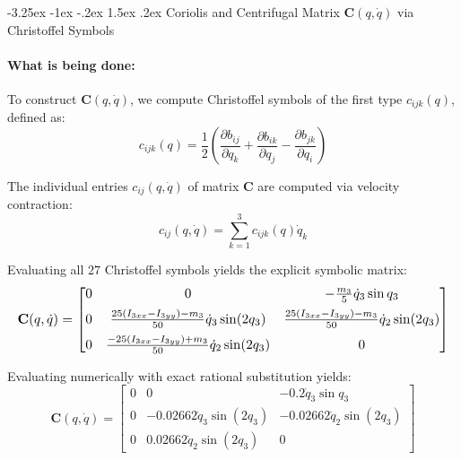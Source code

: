 \documentclass[11pt, a4paper]{article}
\makeatletter
\renewcommand{\subsection}{\@startsection{subsection}{2}{\z@}%
    {-3.25ex \@plus -1ex \@minus -.2ex}%
    {1.5ex \@plus .2ex}%
    {\normalfont\large\bfseries\color{brandaccent}}}
\makeatother
\begin{document}
\subsection{Coriolis and Centrifugal Matrix \texorpdfstring{$\mathbf{C}(q, \dot{q})$}{C(q, dq)} via Christoffel Symbols}
\paragraph{What is being done:}
To construct $\mathbf{C}(q, \dot{q})$, we compute Christoffel symbols of the first type $c_{ijk}(q)$, defined as:
\begin{equation}
    c_{ijk}(q) = \frac{1}{2} \left( \frac{\partial b_{ij}}{\partial q_k} + \frac{\partial b_{ik}}{\partial q_j} - \frac{\partial b_{jk}}{\partial q_i} \right)
\end{equation}

The individual entries $c_{ij}(q, \dot{q})$ of matrix $\mathbf{C}$ are computed via velocity contraction:
\begin{equation}
    c_{ij}(q, \dot{q}) = \sum_{k=1}^{3} c_{ijk}(q) \dot{q}_k
\end{equation}

Evaluating all $27$ Christoffel symbols yields the explicit symbolic matrix:
\begin{equation}
\resizebox{\linewidth}{!}{$
\mathbf{C}(q, \dot{q}) = \begin{bmatrix}
0 & 0 & -\frac{m_3}{5}\dot{q}_3\sin q_3 \\[0.5em]
0 & \frac{25(I_{3xx}-I_{3yy})-m_3}{50}\dot{q}_3\sin(2q_3) & \frac{25(I_{3xx}-I_{3yy})-m_3}{50}\dot{q}_2\sin(2q_3) \\[0.5em]
0 & \frac{-25(I_{3xx}-I_{3yy})+m_3}{50}\dot{q}_2\sin(2q_3) & 0
\end{bmatrix}
$}
\end{equation}

Evaluating numerically with exact rational substitution yields:
\begin{equation}
\mathbf{C}(q, \dot{q}) = \begin{bmatrix}
0 & 0 & -0.2\dot{q}_3\sin q_3 \\[0.3em]
0 & -0.02662\dot{q}_3\sin(2q_3) & -0.02662\dot{q}_2\sin(2q_3) \\[0.3em]
0 & 0.02662\dot{q}_2\sin(2q_3) & 0
\end{bmatrix}
\end{equation}
\end{document}
